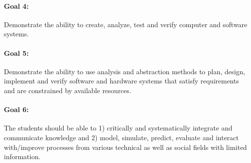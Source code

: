 \paragraph{Goal 4:} Demonstrate the ability to create, analyze,
test and verify computer and software systems.


%
%
%
%
%

\paragraph{Goal 5:} Demonstrate the ability to use analysis and
abstraction methods to plan, design, implement and verify software and
hardware systems that satisfy requirements and are constrained by
available resources.

%
%
%
%

\paragraph{Goal 6:} The students should be able to
%
1) critically and systematically integrate and communicate knowledge
and
%
2) model, simulate, predict, evaluate and interact with/improve
processes from various technical as well as social fields with limited
information.

